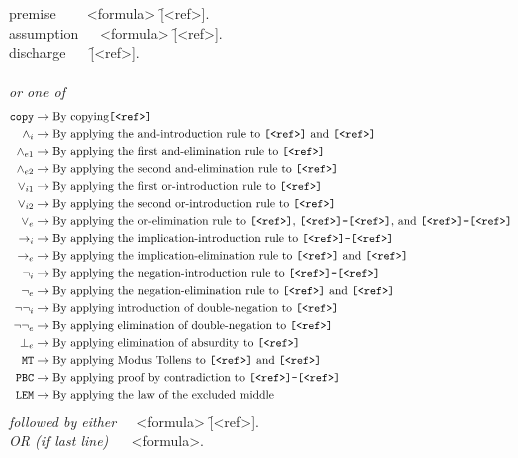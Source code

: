 \documentclass[manual.tex]{subfiles}
\begin{document}
\newcommand{\id}{\f{[<ref>]}}
\newcommand{\idd}{\f{\id -\id}}
{\ttfamily
\noindent
premise $~~~~~~~$\tra {} <formula>  \id. \\
assumption $~~~~$\tra {} <formula> \id.\\
discharge $~~~~~$\tra {} \id.\\~\\
\emph{or one of}
\vspace{-3mm}
\begin{align*}
\f{copy} &\ra\txt{By copying} \id\\
\land_{i} &\ra\txt{By applying the and-introduction rule to }\id\txt{ and }\id\\
\land_{e1} &\ra\txt{By applying the first and-elimination rule to }\id\\
\land_{e2} &\ra\txt{By applying the second and-elimination rule to }\id\\
\lor_{i1} &\ra\txt{By applying the first or-introduction rule to }\id\\
\lor_{i2} &\ra\txt{By applying the second or-introduction rule to }\id\\
\lor_e &\ra\txt{By applying the or-elimination rule to }\id\txt{, }\idd\txt{, and }\idd\\
\ra_i  &\ra\txt{By applying the implication-introduction rule to }\idd\\
\ra_e &\ra\txt{By applying the implication-elimination rule to }\id\txt{ and }\id\\
\neg_i &\ra\txt{By applying the negation-introduction rule to }\idd\\
\neg_e &\ra\txt{By applying the negation-elimination rule to }\id\txt{ and }\id\\
\neg\neg_i &\ra\txt{By applying introduction of double-negation to }\id\\
\neg\neg_e &\ra\txt{By applying elimination of double-negation to }\id\\
\bot_e &\ra\txt{By applying elimination of absurdity to }\id\\
\f{MT} &\ra\txt{By applying Modus Tollens to }\id\txt{ and }\id\\
\f{PBC} &\ra\txt{By applying proof by contradiction to }\idd\\
\f{LEM} &\ra\txt{By applying the law of the excluded middle}
\end{align*}
\emph{followed by either}
$~~~~~$<formula> \id. \\
\emph{OR (if last line)} 
$~~~~~~$<formula>.
}
\end{document}
